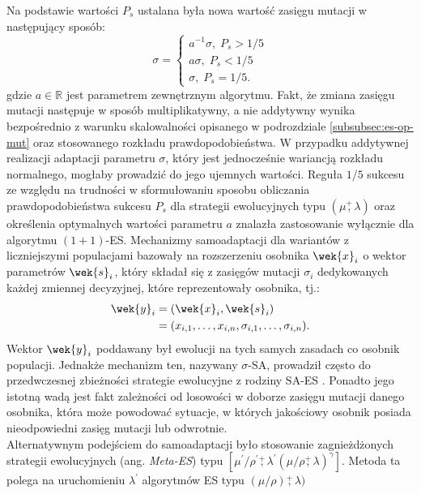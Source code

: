     Na podstawie wartości $P_{s}$ ustalana była nowa wartość zasięgu mutacji w następujący sposób:
    \begin{equation*}
        \sigma = 
            \begin{cases}
                a^{-1}\sigma,\; P_s > 1/5 \\
                a\sigma,\; P_s < 1/5 \\
                \sigma,\; P_s = 1/5.
            \end{cases}
    \end{equation*}
    gdzie $a \in \mathbb{R}$ jest parametrem zewnętrznym algorytmu.
    Fakt, że zmiana zasięgu mutacji następuje w sposób multiplikatywny, a nie addytywny wynika bezpośrednio z warunku skalowalności opisanego w podrozdziale \ref{subsubsec:es-op-mut} oraz stosowanego rozkładu prawdopodobieństwa. W przypadku addytywnej realizacji adaptacji parametru $\sigma$, który jest jednocześnie wariancją rozkładu normalnego, mogłaby prowadzić do jego ujemnych wartości. Reguła $1/5$ sukcesu ze względu na trudności w sformułowaniu sposobu obliczania prawdopodobieństwa sukcesu $P_{s}$ dla strategii ewolucyjnych typu $(\mu\overset{+}{,}\lambda)$ oraz określenia optymalnych wartości parametru $a$ znalazła zastosowanie wyłącznie dla algorytmu $(1+1)$-ES. Mechanizmy samoadaptacji
    dla wariantów z liczniejszymi populacjami bazowały na rozszerzeniu osobnika $\wek{x}_{i}$ o wektor parametrów $\wek{s}_{i}$, który składał się z zasięgów mutacji $\sigma_{i}$ dedykowanych każdej zmiennej decyzyjnej, które reprezentowały osobnika, tj.:
    \begin{equation*}
        \begin{split}
             \wek{y}_{i} & = (\wek{x}_{i}, \wek{s}_{i}) \\
             & = (x_{i, 1}, \dots, x_{i, n}, \sigma_{i, 1}, \dots, \sigma_{i, n}).
        \end{split}
    \end{equation*}
    Wektor $\wek{y}_{i}$ poddawany był ewolucji na tych samych zasadach co osobnik populacji. Jednakże mechanizm ten, nazywany $\sigma$-SA, prowadził często do przedwczesnej zbieżności strategie ewolucyjne z rodziny SA-ES \cite{Hansen:2015}. Ponadto jego istotną wadą jest fakt zależności od losowości w doborze zasięgu mutacji danego osobnika, która może powodować sytuacje, w których jakościowy osobnik posiada nieodpowiedni zasięg mutacji lub odwrotnie. \\
    Alternatywnym podejściem do samoadaptacji było stosowanie zagnieżdżonych strategii ewolucyjnych (ang. \textit{Meta-ES}) typu $[\mu^{'}/\rho^{'}\overset{+}{,}\lambda^{'}(\mu/\rho\overset{+}{,}\lambda)^{\gamma}]$. Metoda ta polega na uruchomieniu $\lambda^{'}$ algorytmów ES typu $(\mu/\rho)\overset{+}{,}\lambda)$
